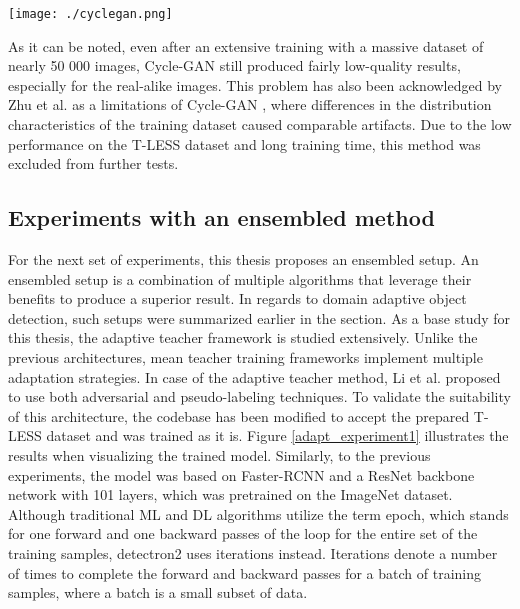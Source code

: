 \documentclass[english, 12pt, a4paper, elec, utf8, a-1b, online]{aaltothesis}
\begin{document}
\begin{table}[htb]
	\begin{center}
		\texttt{[image: ./cyclegan.png]}
	\end{center}
	\begin{center}
		\label{cyclegan}
	\end{center}
\end{table}
\FloatBarrier

As it can be noted, even after an extensive training with a massive dataset of nearly 50 000 images, Cycle-GAN still produced fairly low-quality results, especially for the real-alike images. This problem has also been acknowledged by Zhu et al. as a limitations of Cycle-GAN \cite{Zhu2017}, where differences in the distribution characteristics of the training dataset caused comparable artifacts. Due to the low performance on the T-LESS dataset and long training time, this method was excluded from further tests. 


\subsection{Experiments with an ensembled method}
\label{ensemExp} 
For the next set of experiments, this thesis proposes an ensembled setup. An ensembled setup is a combination of multiple algorithms that leverage their benefits to produce a superior result. In regards to domain adaptive object detection, such setups were summarized earlier in the  section. As a base study for this thesis, the adaptive teacher \cite{Li2021}  framework is studied extensively. Unlike the  previous architectures, mean teacher training frameworks implement multiple adaptation strategies. In case of the adaptive teacher method, Li et al. proposed to use both adversarial and pseudo-labeling techniques. To validate the suitability of this architecture, the codebase has been modified to accept the prepared T-LESS dataset and was trained as it is. Figure \ref{adapt_experiment1} illustrates the results when visualizing the trained model. Similarly, to the previous experiments, the model was based on Faster-RCNN \cite{ima} and a ResNet \cite{He2015} backbone network with 101 layers, which was pretrained on the ImageNet \cite{Russakovsky2014}dataset. Although traditional ML and DL algorithms utilize the term epoch, which stands for one forward and one backward passes of the loop for the entire set of the training samples, detectron2 \cite{wu2019detectron2} uses iterations instead. Iterations denote a number of times to complete the forward and backward passes for a batch of training samples, where a batch is a small subset of data. 
\end{document}
